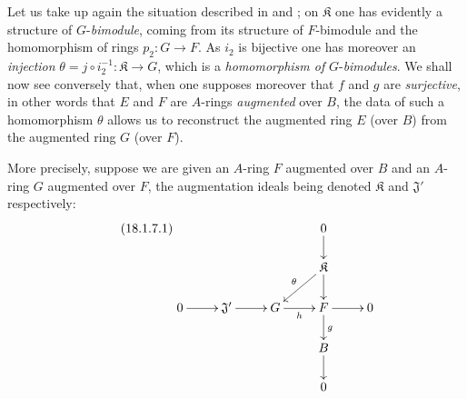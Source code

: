 \begin{env}[18.1.7]
\label{0.18.1.7}
Let us take up again the situation described in  and ; on $\mathfrak{K}$ one has evidently a structure of $G$-\emph{bimodule}, coming from its structure of $F$-bimodule and the homomorphism of rings $p_2:G\to F$.
As $i_2$ is bijective one has moreover an \emph{injection} $\theta=j\circ i_2^{-1}:\mathfrak{K}\to G$, which is a \emph{homomorphism of} $G$-\emph{bimodules}.
We shall now see conversely that, when one supposes moreover that $f$ and $g$ are \emph{surjective}, in other words that $E$ and $F$ are $A$-rings \emph{augmented} over $B$, the data of such a homomorphism $\theta$ allows us to reconstruct the augmented ring $E$ (over $B$) from the augmented ring $G$ (over $F$).

More precisely, suppose we are given an $A$-ring $F$ augmented over $B$ and an $A$-ring $G$ augmented over $F$, the augmentation ideals being denoted $\mathfrak{K}$ and $\mathfrak{J}'$ respectively:
\begin{equation}
\tag{18.1.7.1}
  \label{0.18.1.7.1}
  \xymatrix@C=2pc@R=1.5pc{
    & & & 0\ar[d] & \\
    & & & \mathfrak{K}\ar[ld]_\theta\ar[d] & \\
    0\ar[r] & \mathfrak{J}'\ar[r] & G\ar[r]_h & F\ar[r]\ar[d]^g & 0\\
    & & & B\ar[d] & \\
    & & & 0 &
  }
\end{equation}


\end{env}
